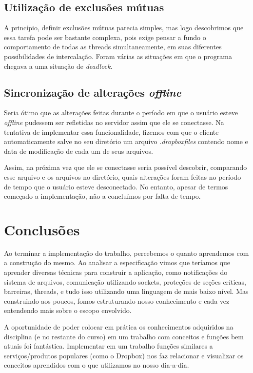 \documentclass[a4paper]{article}
\begin{document}
\subsection{Utilização de exclusões mútuas}
A princípio, definir exclusões mútuas parecia simples, mas logo descobrimos que essa tarefa pode ser bastante complexa, pois exige pensar a fundo o comportamento de todas as threads simultaneamente, em suas diferentes possibilidades de intercalação. Foram várias as situações em que o programa chegava a uma situação de \textit{deadlock}.
 
\subsection{Sincronização de alterações \textit{offline}}
Seria ótimo que as alterações feitas durante o período em que o usuário esteve \textit{offline} pudessem ser refletidas no servidor assim que ele se conectasse. Na tentativa de implementar essa funcionalidade, fizemos com que o cliente automaticamente salve no seu diretório um arquivo \textit{.dropboxfiles} contendo nome e data de modificação de cada um de seus arquivos. 

Assim, na próxima vez que ele se conectasse seria possível descobrir, comparando esse arquivo e os arquivos no diretório, quais alterações foram feitas no período de tempo que o usuário esteve desconectado. 
No entanto, apesar de termos começado a implementação, não a concluímos por falta de tempo.

\section{Conclusões}
Ao terminar a implementação do trabalho, percebemos o quanto aprendemos com a construção do mesmo. Ao analisar a especificação vimos que teríamos que aprender diversas técnicas para construir a aplicação, como notificações do sistema de arquivos, comunicação utilizando sockets, proteções de seções críticas, barreiras, threads, e tudo isso utilizando uma linguagem de mais baixo nível. Mas construindo aos poucos, fomos estruturando nosso conhecimento e cada vez entendendo mais sobre o escopo envolvido.

A oportunidade de poder colocar em prática os conhecimentos adquiridos na disciplina (e no restante do curso) em um trabalho com conceitos e funções bem atuais foi fantástica. Implementar em um trabalho funções similares a serviços/produtos populares (como o Dropbox) nos faz relacionar e visualizar os conceitos aprendidos com o que utilizamos no nosso dia-a-dia.
\end{document}
